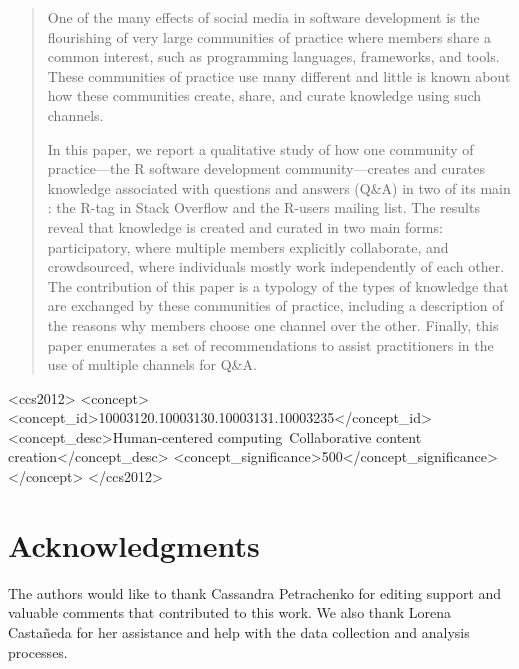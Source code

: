 \documentclass{sig-alternate-05-2015}
\begin{document}
\date{\the\year}

\maketitle

\begin{abstract}
One of the many effects of social media in software development is the flourishing of very large communities of practice where members share a common interest, such as programming languages, frameworks, and tools. These communities of practice use many different \channels and little is known about how these communities create, share, and curate knowledge using such channels.

In this paper, we report a qualitative study of how one community of practice---the R software development community---creates and curates knowledge associated with questions and answers (Q\&A) in two of its main \channels: the R-tag in Stack Overflow and the R-users mailing list. The results reveal that knowledge is created and curated in two main forms: participatory, where multiple members explicitly collaborate, and crowdsourced, where individuals mostly work independently of each other. The contribution of this paper is a typology of the types of knowledge that are exchanged by these communities of practice, including a description of the reasons why members choose one channel over the other.  Finally, this paper enumerates a set of recommendations to assist practitioners in the use of multiple channels for Q\&A. 

\end{abstract}

%
%
\begin{CCSXML}
<ccs2012>
<concept>
<concept_id>10003120.10003130.10003131.10003235</concept_id>
<concept_desc>Human-centered computing~Collaborative content creation</concept_desc>
<concept_significance>500</concept_significance>
</concept>
</ccs2012>
\end{CCSXML}


%
%

%
%
\printccsdesc

\keywords{\mykeywords}



%





\section{Acknowledgments}
The authors would like to thank Cassandra Petrachenko for editing support and valuable comments that contributed to this work. We also thank Lorena Castañeda for her assistance and help with the data collection and analysis processes.



\end{document}
